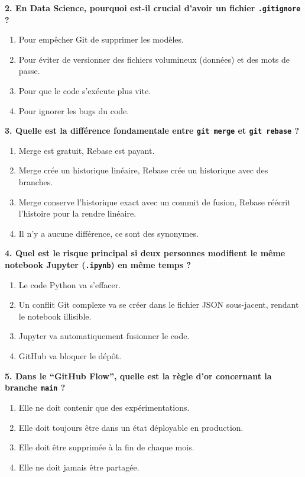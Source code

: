 \documentclass[
  letterpaper,
  DIV=11,
  numbers=noendperiod]{scrreprt}
\providecommand{\tightlist}{%
  \setlength{\itemsep}{0pt}\setlength{\parskip}{0pt}}
\begin{document}
\textbf{2. En Data Science, pourquoi est-il crucial d'avoir un fichier
\texttt{.gitignore} ?}

\begin{enumerate}
\def\labelenumi{\Alph{enumi})}
\tightlist
\item
  Pour empêcher Git de supprimer les modèles.
\item
  Pour éviter de versionner des fichiers volumineux (données) et des
  mots de passe.
\item
  Pour que le code s'exécute plus vite.
\item
  Pour ignorer les bugs du code.
\end{enumerate}

\textbf{3. Quelle est la différence fondamentale entre
\texttt{git\ merge} et \texttt{git\ rebase} ?}

\begin{enumerate}
\def\labelenumi{\Alph{enumi})}
\tightlist
\item
  Merge est gratuit, Rebase est payant.
\item
  Merge crée un historique linéaire, Rebase crée un historique avec des
  branches.
\item
  Merge conserve l'historique exact avec un commit de fusion, Rebase
  réécrit l'histoire pour la rendre linéaire.
\item
  Il n'y a aucune différence, ce sont des synonymes.
\end{enumerate}

\textbf{4. Quel est le risque principal si deux personnes modifient le
même notebook Jupyter (\texttt{.ipynb}) en même temps ?}

\begin{enumerate}
\def\labelenumi{\Alph{enumi})}
\tightlist
\item
  Le code Python va s'effacer.
\item
  Un conflit Git complexe va se créer dans le fichier JSON sous-jacent,
  rendant le notebook illisible.
\item
  Jupyter va automatiquement fusionner le code.
\item
  GitHub va bloquer le dépôt.
\end{enumerate}

\textbf{5. Dans le ``GitHub Flow'', quelle est la règle d'or concernant
la branche \texttt{main} ?}

\begin{enumerate}
\def\labelenumi{\Alph{enumi})}
\tightlist
\item
  Elle ne doit contenir que des expérimentations.
\item
  Elle doit toujours être dans un état déployable en production.
\item
  Elle doit être supprimée à la fin de chaque mois.
\item
  Elle ne doit jamais être partagée.
\end{enumerate}
\end{document}
